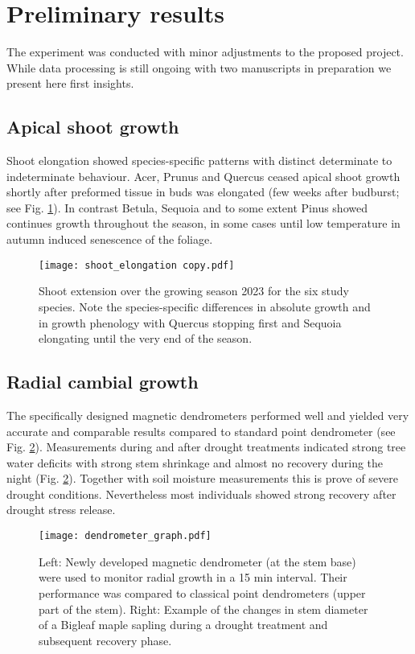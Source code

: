 \documentclass{article}
\begin{document}
	\section*{Preliminary results}
	The experiment was conducted with minor adjustments to the proposed project. While data processing is still ongoing with two manuscripts in preparation we present here first insights.
	
	\subsection*{Apical shoot growth}
	Shoot elongation showed species-specific patterns with distinct determinate to indeterminate behaviour. Acer, Prunus and Quercus ceased apical shoot growth shortly after preformed tissue in buds was elongated (few weeks after budburst; see Fig. \ref{fig:shoot_elongation copy}). In contrast Betula, Sequoia and to some extent Pinus showed continues growth throughout the season, in some cases until low temperature in autumn induced senescence of the foliage.
	
				\begin{figure}[H]
		\centering
		\texttt{[image: shoot\_elongation copy.pdf]} 
		\caption{Shoot extension over the growing season 2023 for the six study species. Note the species-specific differences in absolute growth and in growth phenology with Quercus stopping first and Sequoia elongating until the very end of the season.}
		\label{fig:shoot_elongation copy}
	\end{figure}
	
				\newpage
		\subsection*{Radial cambial growth}
		The specifically designed magnetic dendrometers performed well and yielded very accurate and comparable results compared to standard point dendrometer (see Fig. \ref{fig:dendrometer_graph}). Measurements during and after drought treatments indicated strong tree water deficits with strong stem shrinkage and almost no recovery during the night (Fig. \ref{fig:dendrometer_graph}). Together with soil moisture measurements this is prove of severe drought conditions. Nevertheless most individuals showed strong recovery after drought stress release. 
		
					\begin{figure}[H]
			\centering
			\texttt{[image: dendrometer\_graph.pdf]} 
			\caption{Left: Newly developed magnetic dendrometer (at the stem base) were used to monitor radial growth in a 15 min interval. Their performance was compared to classical point dendrometers (upper part of the stem). Right: Example of the changes in stem diameter of a Bigleaf maple sapling during a drought treatment and subsequent recovery phase.}
			\label{fig:dendrometer_graph}
		\end{figure}
		
\end{document}
